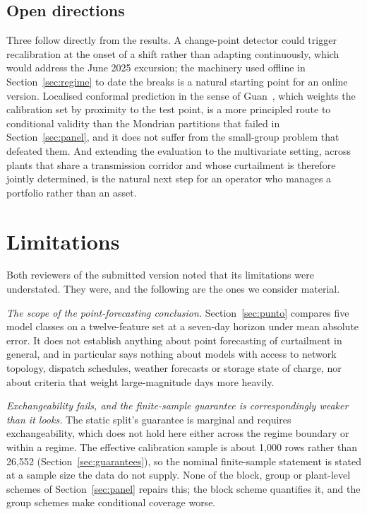 \documentclass[preprint,3p,times]{elsarticle}
\begin{document}
\subsection{Open directions}

Three follow directly from the results. A change-point detector could trigger recalibration at the onset of a shift rather than adapting continuously, which would address the June 2025 excursion; the machinery used offline in Section~\ref{sec:regime} to date the breaks is a natural starting point for an online version. Localised conformal prediction in the sense of Guan~\cite{guan2022}, which weights the calibration set by proximity to the test point, is a more principled route to conditional validity than the Mondrian partitions that failed in Section~\ref{sec:panel}, and it does not suffer from the small-group problem that defeated them. And extending the evaluation to the multivariate setting, across plants that share a transmission corridor and whose curtailment is therefore jointly determined, is the natural next step for an operator who manages a portfolio rather than an asset.

\section{Limitations}
\label{sec:limitations}

Both reviewers of the submitted version noted that its limitations were understated. They were, and the following are the ones we consider material.

\emph{The scope of the point-forecasting conclusion.} Section~\ref{sec:punto} compares five model classes on a twelve-feature set at a seven-day horizon under mean absolute error. It does not establish anything about point forecasting of curtailment in general, and in particular says nothing about models with access to network topology, dispatch schedules, weather forecasts or storage state of charge, nor about criteria that weight large-magnitude days more heavily.

\emph{Exchangeability fails, and the finite-sample guarantee is correspondingly weaker than it looks.} The static split's guarantee is marginal and requires exchangeability, which does not hold here either across the regime boundary or within a regime. The effective calibration sample is about 1{,}000 rows rather than 26{,}552 (Section~\ref{sec:guarantees}), so the nominal finite-sample statement is stated at a sample size the data do not supply. None of the block, group or plant-level schemes of Section~\ref{sec:panel} repairs this; the block scheme quantifies it, and the group schemes make conditional coverage worse.
\end{document}
